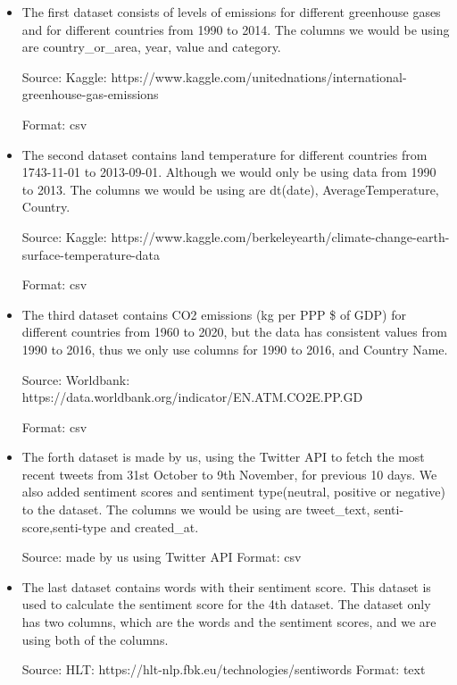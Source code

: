 \documentclass[a4paper, 11pt]{report}
\begin{document}
\begin{itemize}
    \item The first dataset consists of levels of emissions for different greenhouse gases and for different countries from 1990 to 2014. The columns we would be using are country\_or\_area, year, value and category.

    Source: Kaggle: https://www.kaggle.com/unitednations/international-greenhouse-gas-emissions

    Format: csv \\

    \item The second dataset contains land temperature for different countries from 1743-11-01 to 2013-09-01. Although we would only be using data from 1990 to 2013. The columns we would be using are dt(date), AverageTemperature, Country.

        Source: Kaggle: https://www.kaggle.com/berkeleyearth/climate-change-earth-surface-temperature-data

        Format: csv \\


    \item The third dataset contains CO2 emissions (kg per PPP \$ of GDP) for different countries from 1960 to 2020, but the data has consistent values from 1990 to 2016, thus we only use columns for 1990 to 2016, and Country Name.

    Source: Worldbank: https://data.worldbank.org/indicator/EN.ATM.CO2E.PP.GD

    Format: csv\\

    \item The forth dataset is made by us, using the Twitter API to fetch the most recent tweets from 31st October to 9th November, for previous 10 days. We also added sentiment scores and sentiment type(neutral, positive or negative) to the dataset. The columns we would be using are tweet\_text, senti-score,senti-type and created\_at.

    Source: made by us using Twitter API \hspace{.5cm} Format: csv \\

    \item The last dataset contains words with their sentiment score. This dataset is used to calculate the sentiment score for the 4th dataset. The dataset only has two columns, which are the words and the sentiment scores, and we are using both of the columns.

    Source: HLT: https://hlt-nlp.fbk.eu/technologies/sentiwords \hspace{.5cm} Format: text
\end{itemize}
\end{document}
